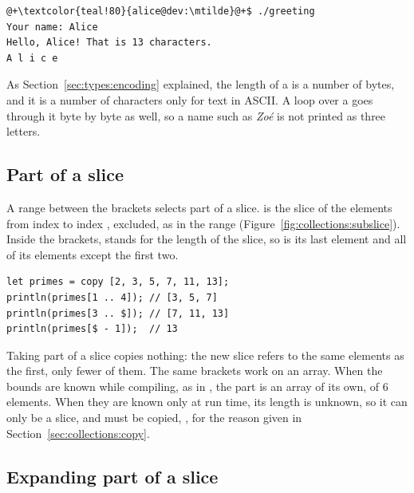 
\vspace{-10pt}%
\begin{lstlisting}[style=bashVerb, escapechar=@+]
@+\textcolor{teal!80}{alice@dev:\mtilde}@+$ ./greeting
Your name: Alice
Hello, Alice! That is 13 characters.
A l i c e
\end{lstlisting}

As Section~\ref{sec:types:encoding} explained, the length of a \token{[c8]} is a
number of bytes, and it is a number of characters only for text in ASCII. A loop
over a \token{[c8]} goes through it byte by byte as well, so a name such as
\textit{Zoé} is not printed as three letters.

\subsection{Part of a slice}

A range between the brackets selects part of a slice.  is the
slice of the elements from index  to index , 
excluded, as in the range 
(Figure~\ref{fig:collections:subslice}). Inside the brackets, \token{\$} stands
for the length of the slice, so  is its last element and
 all of its elements except the first two.

\begin{lstlisting}[style=coloredverbatim]
let primes = copy [2, 3, 5, 7, 11, 13];
println(primes[1 .. 4]); // [3, 5, 7]
println(primes[3 .. $]); // [7, 11, 13]
println(primes[$ - 1]);  // 13
\end{lstlisting}



Taking part of a slice copies nothing: the new slice refers to the same elements
as the first, only fewer of them. The same brackets work on an array. When the
bounds are known while compiling, as in , the part is an
array of its own, of 6 elements. When they are known only at run time, its
length is unknown, so it can only be a slice, and must be copied,
, for the reason given in
Section~\ref{sec:collections:copy}.

\subsection{Expanding part of a slice}
\label{sec:collections:expand_slice}

